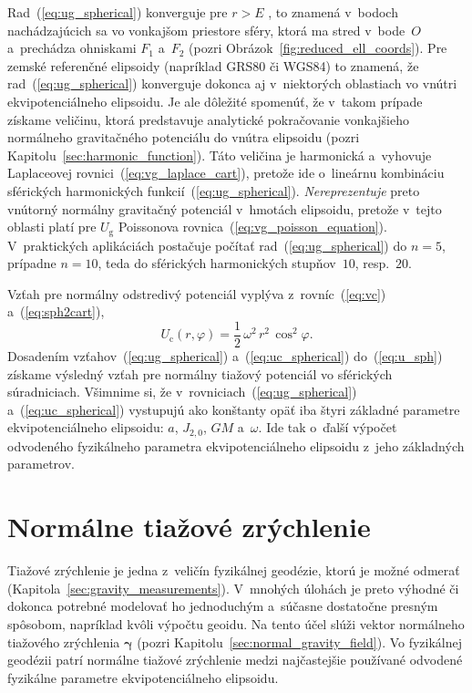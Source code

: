 \documentclass[a4paper, 12pt]{book}
\newcommand{\gidx}{\mathrm g}
\newcommand{\cidx}{\mathrm c}
\begin{document}
Rad~(\ref{eq:ug_spherical}) konverguje pre $r > E$ 
\parencite{MoritzAdvancedGeodesy}, to znamená v~bodoch nachádzajúcich sa vo 
vonkajšom priestore sféry, ktorá ma stred v~bode~$O$ a~prechádza ohniskami 
$F_1$ a~$F_2$ (pozri Obrázok~\ref{fig:reduced_ell_coords}).  Pre zemské 
referenčné elipsoidy (napríklad GRS80 či WGS84) to znamená, že 
rad~(\ref{eq:ug_spherical}) konverguje dokonca aj v~niektorých oblastiach vo 
vnútri ekvipotenciálneho elipsoidu.  Je ale dôležité spomenúť, že v~takom 
prípade získame veličinu, ktorá predstavuje analytické pokračovanie vonkajšieho 
normálneho gravitačného potenciálu do vnútra elipsoidu (pozri 
Kapitolu~\ref{sec:harmonic_function}).  Táto veličina je harmonická a~vyhovuje 
Laplaceovej rovnici~(\ref{eq:vg_laplace_cart}), pretože ide o~lineárnu 
kombináciu sférických harmonických funkcií~(\ref{eq:ug_spherical}).  
\emph{Nereprezentuje} preto vnútorný normálny gravitačný potenciál v~hmotách 
elipsoidu, pretože v~tejto oblasti platí pre $U_\gidx$ Poissonova 
rovnica~(\ref{eq:vg_poisson_equation}).  V~praktických aplikáciách postačuje 
počítať rad~(\ref{eq:ug_spherical}) do $n = 5$, prípadne $n = 10$, teda do 
sférických harmonických stupňov~$10$, resp.~$20$.

Vzťah pre normálny odstredivý potenciál vyplýva z~rovníc~(\ref{eq:vc}) 
a~(\ref{eq:sph2cart}),
%
\begin{equation}
\label{eq:uc_spherical}
U_\cidx(r, \varphi) = \frac{1}{2} \, \omega^2 \, r^2 \, \cos^2\varphi{.}
\end{equation}
%
Dosadením vzťahov~(\ref{eq:ug_spherical}) a~(\ref{eq:uc_spherical}) 
do~(\ref{eq:u_sph}) získame výsledný vzťah pre normálny tiažový potenciál vo 
sférických súradniciach.  Všimnime si, že v~rovniciach~(\ref{eq:ug_spherical}) 
a~(\ref{eq:uc_spherical}) vystupujú ako konštanty opäť iba štyri základné 
parametre ekvipotenciálneho elipsoidu: $a$, $J_{2,0}$, $GM$ a~$\omega$.  Ide 
tak o~ďalší výpočet odvodeného fyzikálneho parametra ekvipotenciálneho 
elipsoidu z~jeho základných parametrov.



\section{Normálne tiažové zrýchlenie}
\label{sec:normal_gravity}

Tiažové zrýchlenie je jedna z~veličín fyzikálnej geodézie, ktorú je možné 
odmerať (Kapitola~\ref{sec:gravity_measurements}).  V~mnohých úlohách je preto 
výhodné či dokonca potrebné modelovať ho jednoduchým a~súčasne dostatočne 
presným spôsobom, napríklad kvôli výpočtu geoidu.  Na tento účel slúži vektor 
normálneho tiažového zrýchlenia $\boldsymbol\gamma$ (pozri 
Kapitolu~\ref{sec:normal_gravity_field}).  Vo fyzikálnej geodézii patrí 
normálne tiažové zrýchlenie medzi najčastejšie používané odvodené fyzikálne 
parametre ekvipotenciálneho elipsoidu.
\end{document}
